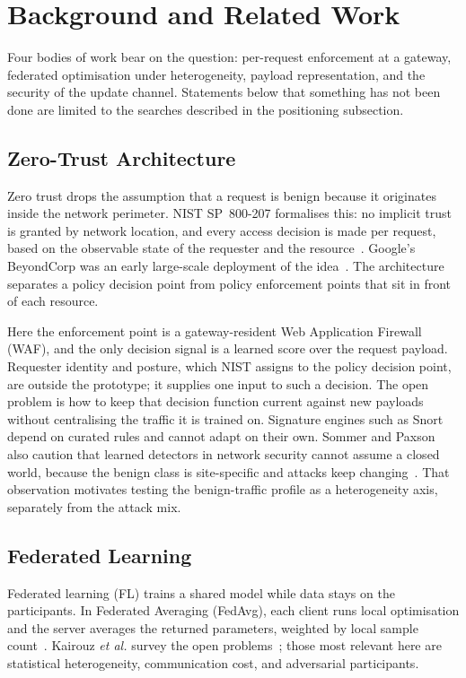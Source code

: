 \section{Background and Related Work}
\label{sec:background}

Four bodies of work bear on the question: per-request enforcement at a gateway, federated optimisation under heterogeneity, payload representation, and the security of the update channel. Statements below that something has not been done are limited to the searches described in the positioning subsection.

\subsection{Zero-Trust Architecture}
Zero trust drops the assumption that a request is benign because it originates inside the network perimeter. NIST SP~800-207 formalises this: no implicit trust is granted by network location, and every access decision is made per request, based on the observable state of the requester and the resource~\cite{nist800207}. Google's BeyondCorp was an early large-scale deployment of the idea~\cite{beyondcorp}. The architecture separates a policy decision point from policy enforcement points that sit in front of each resource.

Here the enforcement point is a gateway-resident Web Application Firewall (WAF), and the only decision signal is a learned score over the request payload. Requester identity and posture, which NIST assigns to the policy decision point, are outside the prototype; it supplies one input to such a decision. The open problem is how to keep that decision function current against new payloads without centralising the traffic it is trained on. Signature engines such as Snort~\cite{roesch1999} depend on curated rules and cannot adapt on their own. Sommer and Paxson also caution that learned detectors in network security cannot assume a closed world, because the benign class is site-specific and attacks keep changing~\cite{sommer2010}. That observation motivates testing the benign-traffic profile as a heterogeneity axis, separately from the attack mix.

\subsection{Federated Learning}
Federated learning (FL) trains a shared model while data stays on the participants. In Federated Averaging (FedAvg), each client runs local optimisation and the server averages the returned parameters, weighted by local sample count~\cite{mcmahan2017}. Kairouz \textit{et al.} survey the open problems~\cite{kairouz2021}; those most relevant here are statistical heterogeneity, communication cost, and adversarial participants.

